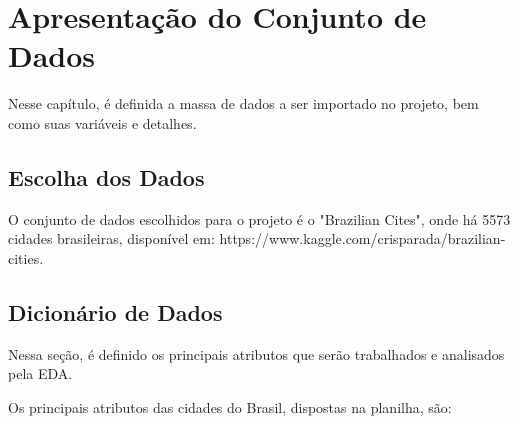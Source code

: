 \chapter{Apresentação do Conjunto de Dados}	

Nesse capítulo, é definida a massa de dados a ser importado no projeto, bem como suas variáveis e detalhes.

\section{Escolha dos Dados}

O conjunto de dados escolhidos para o projeto é o "Brazilian Cites", onde há 5573 cidades brasileiras, disponível em: https://www.kaggle.com/crisparada/brazilian-cities.

\section{Dicionário de Dados}

Nessa seção, é definido os principais atributos que serão trabalhados e analisados pela EDA. 

Os principais atributos das cidades do Brasil, dispostas na planilha, são:


